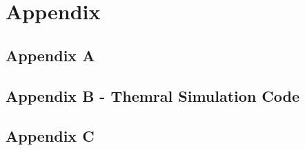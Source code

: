 \section{Appendix}
\subsection{Appendix A}

\subsection{Appendix B - Themral Simulation Code}


\subsection{Appendix C}
